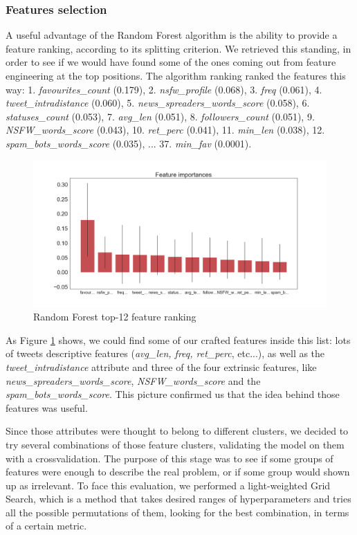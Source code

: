 \subsubsection{Features selection}
A useful advantage of the Random Forest algorithm is the ability to provide a feature ranking, according to its splitting criterion.
We retrieved this standing, in order to see if we would have found some of the ones coming out from feature engineering at the top positions.
The algorithm ranking ranked the features this way: 1. \textit{favourites\_count} (0.179), 2. \textit{nsfw\_profile} (0.068), 3. \textit{freq} (0.061), 4. \textit{tweet\_intradistance} (0.060), 5. \textit{news\_spreaders\_words\_score} (0.058), 6. \textit{statuses\_count} (0.053), 7. \textit{avg\_len} (0.051), 8. \textit{followers\_count} (0.051), 9. \textit{NSFW\_words\_score} (0.043), 10. \textit{ret\_perc} (0.041), 11. \textit{min\_len} (0.038), 12. \textit{spam\_bots\_words\_score} (0.035), ...  37. \textit{min\_fav} (0.0001).

\begin{figure}[htp!]
	\centering
	\includegraphics[width=\columnwidth]{chapter5/figure/top_12_features_importances.png}
	\caption{Random Forest top-12 feature ranking}
	\label{fig:feature_rank}
\end{figure}

As Figure \ref{fig:feature_rank} shows, we could find some of our crafted features inside this list: lots of tweets descriptive features (\textit{avg\_len, freq, ret\_perc}, etc...), as well as the \textit{tweet\_intradistance} attribute and three of the four extrinsic features, like \textit{news\_spreaders\_words\_score}, \textit{NSFW\_words\_score} and the \textit{spam\_bots\_words\_score}.
This picture confirmed us that the idea behind those features was useful.

Since those attributes were thought to belong to different clusters, we decided to try several combinations of those feature clusters, validating the model on them with a crossvalidation. The purpose of this stage was to see if some groups of features were enough to describe the real problem, or if some group would shown up as irrelevant.
To face this evaluation, we performed a light-weighted Grid Search, which is a method that takes desired ranges of hyperparameters and tries all the possible permutations of them, looking for the best combination, in terms of a certain metric.

